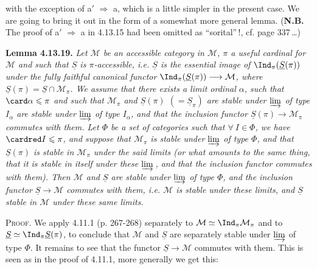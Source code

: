 \setcounter{footnote}{143}


with the exception of a$'$ $\Longrightarrow$ a, which is a little simpler in the present case. We are going to bring it out in the form of a somewhat more general lemma. (\textbf{N.B.} The proof of a$'$ $\Longrightarrow$ a in 4.13.15 had been omitted as ``sorital''\,!, cf. page 337\,\dots)

\textbf{Lemma 4.13.19.} \textit{Let $\mathcal{M}$ be an accessible category in $\mathcal{M}$, $\pi$ a useful cardinal for $\mathcal{M}$ and such that $\underline{S}$ is $\pi$-accessible, i.e. $\underline{S}$ is the essential image of $\Ind_\pi(\underline{S}(\pi))$ under the fully faithful canonical functor $\Ind_\pi(\underline{S}(\pi))\longrightarrow\mathcal{M}$, where $\underline{S}(\pi)=\underline{S}\cap\mathcal{M}_\pi$. We assume that there exists a limit ordinal $\alpha$, such that $\card\alpha\leqslant\pi$ and such that $\mathcal{M}_\pi$ and $\underline{S}(\pi)$ $(=\underline{S}_\pi)$ are stable under $\varinjlim$ of type $I_\alpha$ are stable under $\varinjlim$ of type $I_\alpha$, and that the inclusion functor $\underline{S}(\pi)\longrightarrow\mathcal{M}_\pi$ commutes with them. Let $\Phi$ be a set of categories such that $\forall\ I\in\Phi$, we have $\cardred I\leqslant\pi$, and suppose that $\mathcal{M}_\pi$ is stable under $\varinjlim$ of type $\Phi$, and that $\underline{S}(\pi)$ is stable in $\mathcal{M}_\pi$ under the said limits (or what amounts to the same thing, that it is stable in itself under these $\varinjlim$\,, and that the inclusion functor commutes with them). Then $\mathcal{M}$ and $\underline{S}$ are stable under $\varinjlim$ of type $\Phi$, and the inclusion functor $\underline{S}\longrightarrow\mathcal{M}$ commutes with them, i.e. $\mathcal{M}$ is stable under these limits, and $\underline{S}$ stable in $\mathcal{M}$ under these same limits.} %

\textsc{Proof}. We apply 4.11.1 (p. 267-268) separately to $\mathcal{M}\simeq\Ind_\pi\mathcal{M}_\pi$ and to $\underline{S}\simeq\Ind_\pi\underline{S}(\pi)$, to conclude that $\mathcal{M}$ and $\underline{S}$ are separately stable under $\varinjlim$ of type $\Phi$. It remains to see that the functor $\underline{S}\longrightarrow\mathcal{M}$ commutes with them. This is seen as in the proof of 4.11.1, more generally we get this:


